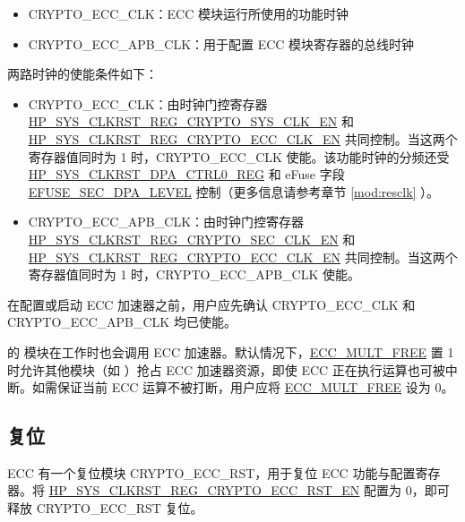 \documentclass[main\_\_CN.tex]{subfiles}
\begin{document}
\begin{itemize}
    \item CRYPTO\_ECC\_CLK：ECC 模块运行所使用的功能时钟
    \item CRYPTO\_ECC\_APB\_CLK：用于配置 ECC 模块寄存器的总线时钟
\end{itemize}


两路时钟的使能条件如下：

\begin{itemize}
    \item CRYPTO\_ECC\_CLK：由时钟门控寄存器 \hyperref[fielddesc:HPSYSCLKRSTREGCRYPTOSYSCLKEN]{HP\_SYS\_CLKRST\_REG\_CRYPTO\_SYS\_CLK\_EN} 和 \hyperref[fielddesc:HPSYSCLKRSTREGCRYPTOECCCLKEN]{HP\_SYS\_CLKRST\_REG\_CRYPTO\_ECC\_CLK\_EN} 共同控制。当这两个寄存器值同时为 1 时，CRYPTO\_ECC\_CLK 使能。该功能时钟的分频还受 \hyperref[regdesc:HPSYSCLKRSTDPACTRL0REG]{HP\_SYS\_CLKRST\_DPA\_CTRL0\_REG} 和 eFuse 字段 \hyperref[fielddesc:EFUSESECDPALEVE]{EFUSE\_SEC\_DPA\_LEVEL} 控制（更多信息请参考章节 \ref{mod:resclk} \textit{}）。
    \item CRYPTO\_ECC\_APB\_CLK：由时钟门控寄存器 \hyperref[fielddesc:HPSYSCLKRSTREGCRYPTOSECCLKEN]{HP\_SYS\_CLKRST\_REG\_CRYPTO\_SEC\_CLK\_EN} 和 \hyperref[fielddesc:HPSYSCLKRSTREGCRYPTOECCCLKEN]{HP\_SYS\_CLKRST\_REG\_CRYPTO\_ECC\_CLK\_EN} 共同控制。当这两个寄存器值同时为 1 时，CRYPTO\_ECC\_APB\_CLK 使能。
\end{itemize}

在配置或启动 ECC 加速器之前，用户应先确认 CRYPTO\_ECC\_CLK 和 CRYPTO\_ECC\_APB\_CLK 均已使能。

\begin{importantlisting}
\chipname{} 的  模块在工作时也会调用 ECC 加速器。默认情况下，\hyperref[fielddesc:ECCMULTFREE]{ECC\_MULT\_FREE} 置 1 时允许其他模块（如 ）抢占 ECC 加速器资源，即使 ECC 正在执行运算也可被中断。如需保证当前 ECC 运算不被打断，用户应将 \hyperref[fielddesc:ECCMULTFREE]{ECC\_MULT\_FREE} 设为 0。
\end{importantlisting}
\vspace{-0.5em}

\subsection{复位}

\chipname{} ECC 有一个复位模块 CRYPTO\_ECC\_RST，用于复位 ECC 功能与配置寄存器。将 \hyperref[fielddesc:HPSYSCLKRSTREGCRYPTOECCRSTEN]{HP\_SYS\_CLKRST\_REG\_CRYPTO\_ECC\_RST\_EN} 配置为 0，即可释放 CRYPTO\_ECC\_RST 复位。
\end{document}
